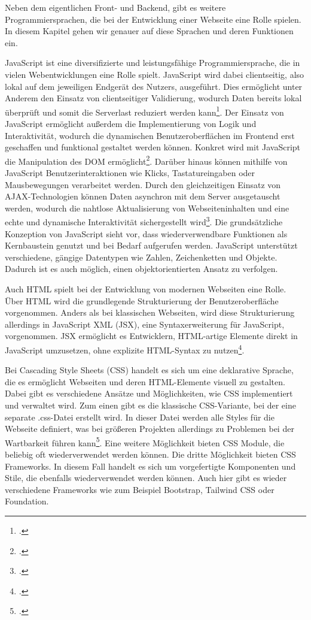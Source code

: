 Neben dem eigentlichen Front- und Backend, gibt es weitere Programmiersprachen, die bei der Entwicklung einer Webseite eine Rolle spielen. In diesem Kapitel gehen wir genauer auf diese Sprachen und deren Funktionen ein.

JavaScript ist eine diversifizierte und leistungsfähige Programmiersprache, die in vielen Webentwicklungen eine Rolle spielt. JavaScript wird dabei clientseitig, also lokal auf dem jeweiligen Endgerät des Nutzers, ausgeführt. Dies ermöglicht unter Anderem den Einsatz von clientseitiger Validierung, wodurch Daten bereits lokal überprüft und somit die Serverlast reduziert werden kann\footcite{sikora_professionelles_nodate}.
Der Einsatz von JavaScript ermöglicht außerdem die Implementierung von Logik und Interaktivität, wodurch die dynamischen Benutzeroberflächen im Frontend erst geschaffen und funktional gestaltet werden können. Konkret wird mit JavaScript die Manipulation des DOM ermöglicht\footcite{autor_funktionen_nodate}.
Darüber hinaus können mithilfe von JavaScript Benutzerinteraktionen wie Klicks, Tastatureingaben oder Mausbewegungen verarbeitet werden. Durch den gleichzeitigen Einsatz von AJAX-Technologien können Daten asynchron mit dem Server ausgetauscht werden, wodurch die nahtlose Aktualisierung von Webseiteninhalten  und eine echte und dynamische Interaktivität sichergestellt wird\footcite{autor_javascript_nodate}.
Die grundsätzliche Konzeption von JavaScript sieht vor, dass wiederverwendbare Funktionen als Kernbaustein genutzt und bei Bedarf aufgerufen werden. JavaScript unterstützt verschiedene, gängige Datentypen wie Zahlen, Zeichenketten und Objekte. Dadurch ist es auch möglich, einen objektorientierten Ansatz zu verfolgen.

Auch HTML spielt bei der Entwicklung von modernen Webseiten eine Rolle. Über HTML wird die grundlegende Strukturierung der Benutzeroberfläche vorgenommen.
Anders als bei klassischen Webseiten, wird diese Strukturierung allerdings in JavaScript XML (JSX), eine Syntaxerweiterung für JavaScript, vorgenommen.
JSX ermöglicht es Entwicklern, HTML-artige Elemente direkt in JavaScript umzusetzen, ohne explizite HTML-Syntax zu nutzen\footcite{w3schools_react_nodate}.

Bei Cascading Style Sheets (CSS) handelt es sich um eine deklarative Sprache, die es ermöglicht Webseiten und deren HTML-Elemente visuell zu gestalten. Dabei gibt es verschiedene Ansätze und Möglichkeiten, wie CSS implementiert und verwaltet wird.
Zum einen gibt es die klassische CSS-Variante, bei der eine separate .css-Datei erstellt wird. In dieser Datei werden alle Styles für die Webseite definiert, was bei größeren Projekten allerdings zu Problemen bei der Wartbarkeit führen kann\footcite{autor_welche_2019}.
Eine weitere Möglichkeit bieten CSS Module, die beliebig oft wiederverwendet werden können.
Die dritte Möglichkeit bieten CSS Frameworks. In diesem Fall handelt es sich um vorgefertigte Komponenten und Stile, die ebenfalls wiederverwendet werden können. Auch hier gibt es wieder verschiedene Frameworks wie zum Beispiel Bootstrap, Tailwind CSS oder Foundation.